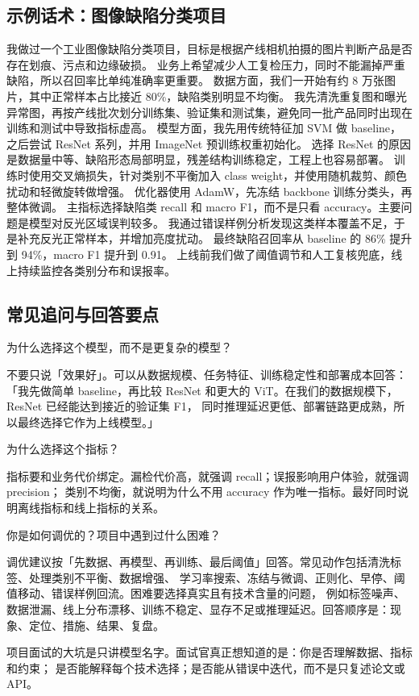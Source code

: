 \subsection{示例话术：图像缺陷分类项目}
\begin{answer}
我做过一个工业图像缺陷分类项目，目标是根据产线相机拍摄的图片判断产品是否存在划痕、污点和边缘破损。
业务上希望减少人工复检压力，同时不能漏掉严重缺陷，所以召回率比单纯准确率更重要。
数据方面，我们一开始有约 8 万张图片，其中正常样本占比接近 80\%，缺陷类别明显不均衡。
我先清洗重复图和曝光异常图，再按产线批次划分训练集、验证集和测试集，避免同一批产品同时出现在训练和测试中导致指标虚高。
模型方面，我先用传统特征加 SVM 做 baseline，之后尝试 ResNet 系列，并用 ImageNet 预训练权重初始化。
选择 ResNet 的原因是数据量中等、缺陷形态局部明显，残差结构训练稳定，工程上也容易部署。
训练时使用交叉熵损失，针对类别不平衡加入 class weight，并使用随机裁剪、颜色扰动和轻微旋转做增强。
优化器使用 AdamW，先冻结 backbone 训练分类头，再整体微调。
主指标选择缺陷类 recall 和 macro F1，而不是只看 accuracy。主要问题是模型对反光区域误判较多。
我通过错误样例分析发现这类样本覆盖不足，于是补充反光正常样本，并增加亮度扰动。
最终缺陷召回率从 baseline 的 86\% 提升到 94\%，macro F1 提升到 0.91。
上线前我们做了阈值调节和人工复核兜底，线上持续监控各类别分布和误报率。
\end{answer}
\subsection{常见追问与回答要点}
\begin{interview}
为什么选择这个模型，而不是更复杂的模型？
\end{interview}
\begin{answer}
不要只说「效果好」。可以从数据规模、任务特征、训练稳定性和部署成本回答：
「我先做简单 baseline，再比较 ResNet 和更大的 ViT。在我们的数据规模下，ResNet 已经能达到接近的验证集 F1，
同时推理延迟更低、部署链路更成熟，所以最终选择它作为上线模型。」
\end{answer}
\begin{interview}
为什么选择这个指标？
\end{interview}
\begin{answer}
指标要和业务代价绑定。漏检代价高，就强调 recall；误报影响用户体验，就强调 precision；
类别不均衡，就说明为什么不用 accuracy 作为唯一指标。最好同时说明离线指标和线上指标的关系。
\end{answer}
\begin{interview}
你是如何调优的？项目中遇到过什么困难？
\end{interview}
\begin{answer}
调优建议按「先数据、再模型、再训练、最后阈值」回答。常见动作包括清洗标签、处理类别不平衡、数据增强、
学习率搜索、冻结与微调、正则化、早停、阈值移动、错误样例回流。困难要选择真实且有技术含量的问题，
例如标签噪声、数据泄漏、线上分布漂移、训练不稳定、显存不足或推理延迟。回答顺序是：现象、定位、措施、结果、复盘。
\end{answer}
\begin{trap}
项目面试的大坑是只讲模型名字。面试官真正想知道的是：你是否理解数据、指标和约束；
是否能解释每个技术选择；是否能从错误中迭代，而不是只复述论文或 API。
\end{trap}
